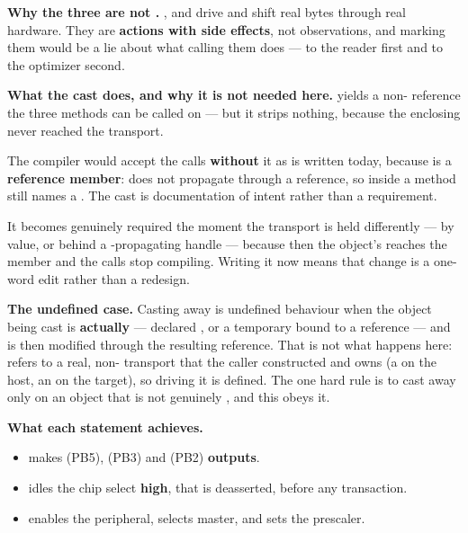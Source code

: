 \textbf{Why the three are not .} ,  and 
drive  and shift real bytes through real hardware. They are \textbf{actions with side
effects}, not observations, and marking them  would be a lie about what calling them
does --- to the reader first and to the optimizer second. 

\textbf{What the cast does, and why it is not needed here.}
 yields a non- reference the three
methods can be called on --- but it strips nothing, because the enclosing  never reached
the transport.

The compiler would accept the calls \textbf{without} it as  is written today, because
 is a \textbf{reference member}:  does not propagate through a
reference, so inside a  method  still names a
. The cast is documentation of intent rather than a requirement.

It becomes genuinely required the moment the transport is held differently --- by value, or behind a
-propagating handle --- because then the object's  reaches the member and the
calls stop compiling. Writing it now means that change is a one-word edit rather than a redesign.

\textbf{The undefined case.} Casting away  is undefined behaviour when the object being
cast is \textbf{actually } --- declared , or a temporary bound to a
 reference --- and is then modified through the resulting reference. That is not what
happens here:  refers to a real, non- transport that the caller
constructed and owns (a  on the host, an  on the target), so driving it is
defined. The one hard rule is to cast away  only on an object that is not genuinely
, and this obeys it. 


\textbf{What each statement achieves.}
\begin{itemize}
  \item {} makes  (PB5),  (PB3) and  (PB2)
    \textbf{outputs}.
  \item {} idles the chip select \textbf{high}, that is deasserted, before
    any transaction.
  \item {} enables the peripheral, selects master, and sets the prescaler.
\end{itemize}

